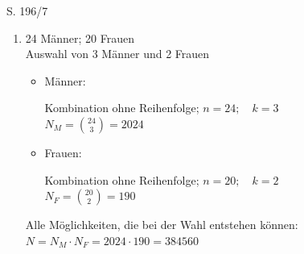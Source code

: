 \begin{Exercise}{S. 196/7}{}
\begin{enumerate}[leftmargin=*]
    \item [7.]{
        24 Männer; 20 Frauen\\[1.0ex]
        Auswahl von 3 Männer und 2 Frauen
        \begin{itemize}[leftmargin=*]
            \item Männer: \quad \begin{minipage}[t]{\linewidth}
                Kombination ohne Reihenfolge; \quad $n = 24; \quad k = 3$\\[1.5ex]
                $N_{M} = \displaystyle \binom{24}{3} = 2024$\\
            \end{minipage}
            \item Frauen: \quad \begin{minipage}[t]{\linewidth}
                Kombination ohne Reihenfolge; \quad $n = 20; \quad k = 2$\\[1.5ex]
                $N_{F} = \displaystyle \binom{20}{2} = 190$\\
            \end{minipage}
        \end{itemize}
        Alle Möglichkeiten, die bei der Wahl entstehen können: $N = N_{M} \cdot N_{F} = 2024 \cdot 190 = 384560$\\
    }
\end{enumerate}
\end{Exercise}
\pagebreak

